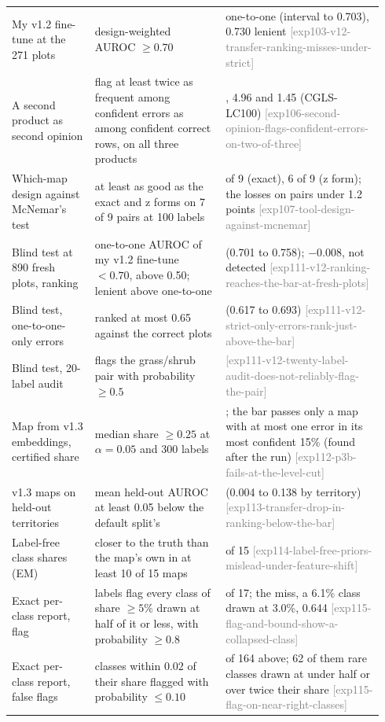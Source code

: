 \documentclass[11pt,a4paper]{article}
\newcommand{\claim}[1]{{\scriptsize\textsf{\textcolor{gray}{[#1]}}}}
\begin{document}
{\begin{longtable}{@{}>{\raggedright\arraybackslash}p{0.21\linewidth}>{\raggedright\arraybackslash}p{0.33\linewidth}>{\raggedright\arraybackslash}p{0.40\linewidth}@{}}
My v1.2 fine-tune at the 271 plots & design-weighted AUROC $\ge 0.70$ & 0.642 one-to-one (interval to 0.703), 0.730 lenient \claim{exp103-v12-transfer-ranking-misses-under-strict} \\
A second product as second opinion & flag at least twice as frequent among confident errors as among confident correct rows, on all three products & 4.11, 4.96 and 1.45 (CGLS-LC100) \claim{exp106-second-opinion-flags-confident-errors-on-two-of-three} \\
Which-map design against McNemar's test & at least as good as the exact and z forms on 7 of 9 pairs at 100 labels & 8 of 9 (exact), 6 of 9 (z form); the losses on pairs under 1.2 points \claim{exp107-tool-design-against-mcnemar} \\
Blind test at 890 fresh plots, ranking & one-to-one AUROC of my v1.2 fine-tune $< 0.70$, above 0.50; lenient above one-to-one & 0.729 (0.701 to 0.758); $-0.008$, not detected \claim{exp111-v12-ranking-reaches-the-bar-at-fresh-plots} \\
Blind test, one-to-one-only errors & ranked at most 0.65 against the correct plots & 0.656 (0.617 to 0.693) \claim{exp111-v12-strict-only-errors-rank-just-above-the-bar} \\
Blind test, 20-label audit & flags the grass/shrub pair with probability $\ge 0.5$ & 0.287 \claim{exp111-v12-twenty-label-audit-does-not-reliably-flag-the-pair} \\
Map from v1.3 embeddings, certified share & median share $\ge 0.25$ at $\alpha = 0.05$ and 300 labels & 0.075; the bar passes only a map with at most one error in its most confident 15\% (found after the run) \claim{exp112-p3b-fails-at-the-level-cut} \\
v1.3 maps on held-out territories & mean held-out AUROC at least 0.05 below the default split's & 0.047 (0.004 to 0.138 by territory) \claim{exp113-transfer-drop-in-ranking-below-the-bar} \\
Label-free class shares (EM) & closer to the truth than the map's own in at least 10 of 15 maps & 3 of 15 \claim{exp114-label-free-priors-mislead-under-feature-shift} \\
Exact per-class report, flag & 400 labels flag every class of share $\ge 5\%$ drawn at half of it or less, with probability $\ge 0.8$ & 16 of 17; the miss, a 6.1\% class drawn at 3.0\%, 0.644 \claim{exp115-flag-and-bound-show-a-collapsed-class} \\
Exact per-class report, false flags & classes within 0.02 of their share flagged with probability $\le 0.10$ & 69 of 164 above; 62 of them rare classes drawn at under half or over twice their share \claim{exp115-flag-on-near-right-classes} \\

\end{longtable}}
\end{document}

